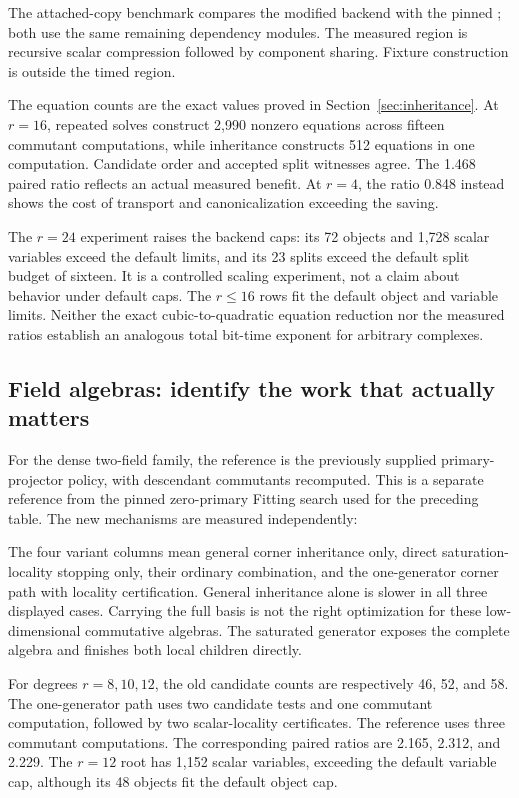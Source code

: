 The attached-copy benchmark compares the modified backend with the pinned
; both use the same remaining dependency modules.
The measured region is recursive scalar compression followed by component
sharing. Fixture construction is outside the timed region.



The equation counts are the exact values proved in
Section~\ref{sec:inheritance}. At $r=16$, repeated solves construct 2,990
nonzero equations across fifteen commutant computations, while inheritance
constructs 512 equations in one computation. Candidate order and accepted
split witnesses agree. The 1.468 paired ratio reflects an actual measured
benefit. At $r=4$, the ratio 0.848 instead shows the cost of transport and
canonicalization exceeding the saving.

The $r=24$ experiment raises the backend caps: its 72 objects and 1,728
scalar variables exceed the default limits, and its 23 splits exceed the
default split budget of sixteen. It is a controlled scaling experiment,
not a claim about behavior under default caps. The $r\le16$ rows fit the
default object and variable limits. Neither the exact cubic-to-quadratic
equation reduction nor the measured ratios establish an analogous total
bit-time exponent for arbitrary complexes.

\subsection{Field algebras: identify the work that actually matters}

For the dense two-field family, the reference is the previously supplied
primary-projector policy, with descendant commutants recomputed. This is
a separate reference from the pinned zero-primary Fitting search used for
the preceding table. The new mechanisms are measured independently:



The four variant columns mean general corner inheritance only, direct
saturation-locality stopping only, their ordinary combination, and the
one-generator corner path with locality certification. General inheritance
alone is slower in all three displayed cases. Carrying the full basis is
not the right optimization for these low-dimensional commutative algebras.
The saturated generator exposes the complete algebra and finishes both
local children directly.

For degrees $r=8,10,12$, the old candidate counts are respectively
46, 52, and 58. The one-generator path uses two candidate tests and one
commutant computation, followed by two scalar-locality certificates.
The reference uses three commutant computations. The corresponding paired
ratios are 2.165, 2.312, and 2.229. The $r=12$ root has 1,152 scalar
variables, exceeding the default variable cap, although its 48 objects
fit the default object cap.

